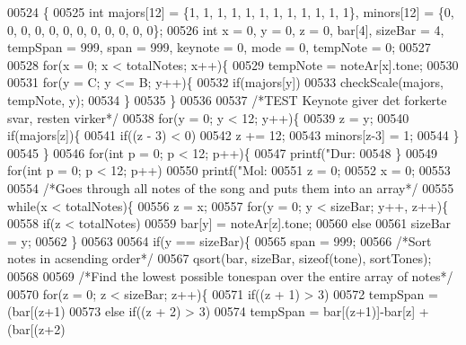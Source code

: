 \begin{DoxyCode}
00524                                                         \{
00525   \textcolor{keywordtype}{int} majors[12] = \{1, 1, 1, 1, 1, 1, 1, 1, 1, 1, 1, 1\}, minors[12] = \{0, 0, 0, 0, 0, 0, 0, 0, 0, 0, 0, 0\};
00526   \textcolor{keywordtype}{int} x = 0, y = 0, z = 0, bar[4], sizeBar = 4, tempSpan = 999, span = 999, keynote = 0, 
      mode = 0, tempNote = 0;
00527 
00528   \textcolor{keywordflow}{for}(x = 0; x < totalNotes; x++)\{
00529     tempNote = noteAr[x].tone;
00530  
00531     \textcolor{keywordflow}{for}(y = C; y <= B; y++)\{
00532       \textcolor{keywordflow}{if}(majors[y])
00533         checkScale(majors, tempNote, y);
00534     \}
00535   \}
00536 
00537   \textcolor{comment}{/*TEST Keynote giver det forkerte svar, resten virker*/}
00538   \textcolor{keywordflow}{for}(y = 0; y < 12; y++)\{
00539     z = y;
00540     \textcolor{keywordflow}{if}(majors[z])\{
00541       \textcolor{keywordflow}{if}((z - 3) < 0)
00542         z += 12;
00543     minors[z-3] = 1;
00544     \}
00545   \}
00546   \textcolor{keywordflow}{for}(\textcolor{keywordtype}{int} p = 0; p < 12; p++)\{
00547     printf(\textcolor{stringliteral}{"Dur: %
00548   \}
00549   \textcolor{keywordflow}{for}(\textcolor{keywordtype}{int} p = 0; p < 12; p++)
00550     printf(\textcolor{stringliteral}{"Mol: %
00551   z = 0;
00552   x = 0;
00553 
00554   \textcolor{comment}{/*Goes through all notes of the song and puts them into an array*/}
00555   \textcolor{keywordflow}{while}(x < totalNotes)\{
00556     z = x;
00557     \textcolor{keywordflow}{for}(y = 0; y < sizeBar; y++, z++)\{
00558       \textcolor{keywordflow}{if}(z < totalNotes)
00559         bar[y] = noteAr[z].tone;
00560       \textcolor{keywordflow}{else}
00561         sizeBar = y;
00562     \}
00563 
00564     \textcolor{keywordflow}{if}(y == sizeBar)\{
00565       span = 999;
00566       \textcolor{comment}{/*Sort notes in acsending order*/}
00567       qsort(bar, sizeBar, \textcolor{keyword}{sizeof}(tone), sortTones);
00568 
00569       \textcolor{comment}{/*Find the lowest possible tonespan over the entire array of notes*/}
00570       \textcolor{keywordflow}{for}(z = 0; z < sizeBar; z++)\{
00571     \textcolor{keywordflow}{if}((z + 1) > 3)
00572           tempSpan = (bar[(z+1)%
00573         \textcolor{keywordflow}{else} \textcolor{keywordflow}{if}((z + 2) > 3)
00574           tempSpan = bar[(z+1)]-bar[z] + (bar[(z+2)%
}}
\end{DoxyCode}
